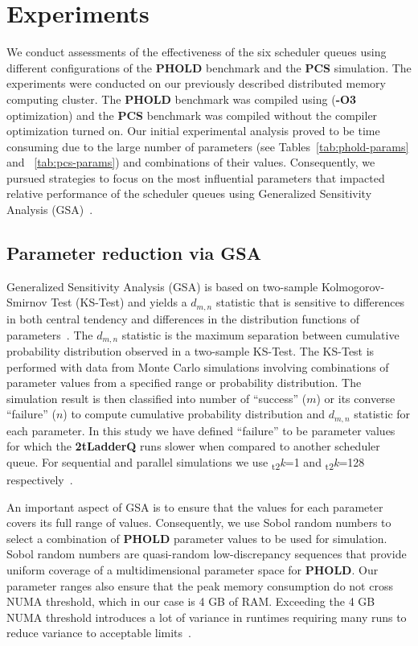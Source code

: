 \chapter{Experiments}\label{sec:experiments}

We conduct assessments of the effectiveness of the six scheduler queues using different configurations of the \textbf{PHOLD} benchmark and the \textbf{PCS} simulation. The experiments were conducted on our previously described distributed memory computing cluster. The \textbf{PHOLD} benchmark was compiled using (\textbf{-O3} optimization) and the \textbf{PCS} benchmark was compiled without the compiler optimization turned on. Our initial experimental analysis proved to be time consuming due to the large number of parameters (see Tables~\ref{tab:phold-params} and ~\ref{tab:pcs-params}) and combinations of their values. Consequently, we pursued strategies to focus on the most influential parameters that impacted relative performance of the scheduler queues using Generalized Sensitivity Analysis (GSA)~\cite{guven-07, higiro2017multi}. 

\section{Parameter reduction via GSA}\label{sec:gsa}

Generalized Sensitivity Analysis (GSA) is based on two-sample Kolmogorov-Smirnov Test (KS-Test) and yields a $d_{m,n}$ statistic
that is sensitive to differences in both central tendency and differences in the distribution functions of
parameters~\cite{guven-07}. The $d_{m,n}$ statistic is the maximum separation between cumulative probability distribution observed in a
two-sample KS-Test. The KS-Test is performed with data from Monte Carlo simulations involving combinations of parameter values from a
specified range or probability distribution. The simulation result is then classified into number of ``success'' ($m$) or its converse
``failure'' ($n$) to compute cumulative probability distribution and $d_{m,n}$ statistic for each parameter. In this study we have defined
``failure'' to be parameter values for which the \textbf{2tLadderQ} runs slower when compared to another scheduler queue. For sequential and parallel simulations we use \textsubscript{t2}\textit{k}=1 and \textsubscript{t2}\textit{k}=128 respectively~\cite{higiro2017multi}.

An important aspect of GSA is to ensure that the values for each parameter covers its full range of values. Consequently, we use Sobol
random numbers to select a combination of \textbf{PHOLD} parameter values to be used for simulation. Sobol random numbers are quasi-random
low-discrepancy sequences that provide uniform coverage of a multidimensional parameter space for \textbf{PHOLD}\cite{levy2002introduction}. Our parameter ranges also ensure that the peak memory consumption do not cross NUMA threshold, which in our case is 4 GB of RAM. Exceeding the 4 GB NUMA threshold introduces a lot of variance in runtimes requiring many runs to reduce variance to acceptable limits~\cite{higiro2017multi}.

